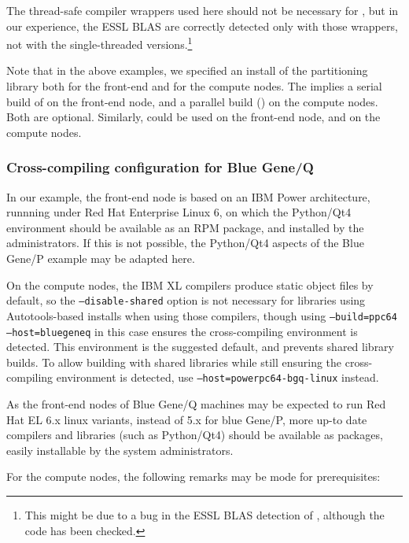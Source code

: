 \documentclass[a4paper,10pt,twoside]{csshortdoc}
\begin{document}
The thread-safe compiler wrappers used here should not be necessary for \CS, but in our
experience, the ESSL BLAS are correctly detected only with those wrappers,
not with the single-threaded versions.\footnote{This might be due to a bug in the ESSL
BLAS detection of \CS, although the code has been checked.}

Note that in the above examples, we specified an install of the \scotch
partitioning library both for the front-end and for the compute nodes.
The implies a serial build of \scotch on the front-end node, and a parallel
build (\ptscotch) on the compute nodes. Both are optional.
Similarly, \metis could be used on the front-end node, and \parmetis
on the compute nodes.

\subsubsection{Cross-compiling configuration for Blue Gene/Q}

In our example, the front-end node is based on an IBM Power architecture,
runnning under Red Hat Enterprise Linux 6, on which the Python/Qt4
environment should be available as an RPM package, and installed by the
administrators. If this is not possible, the Python/Qt4 aspects of the
Blue Gene/P example may be adapted here.

On the compute nodes, the IBM XL compilers produce static object files
by default, so the \texttt{--disable-shared} option is not necessary
for libraries using Autotools-based installs when using those compilers,
though using \texttt{--build=ppc64 --host=bluegeneq} in this case ensures
the cross-compiling environment is detected. This environment
is the suggested default, and prevents shared library builds.
To allow building with shared libraries while still ensuring the
cross-compiling environment is detected,
use \texttt{--host=powerpc64-bgq-linux} instead.

As the front-end nodes of Blue Gene/Q machines may be expected to run
Red Hat EL 6.x linux variants, instead of 5.x for blue Gene/P, more
up-to date compilers and libraries (such as Python/Qt4) should be available
as packages, easily installable by the system administrators.

For the compute nodes, the following remarks may be mode for prerequisites:
\end{document}
